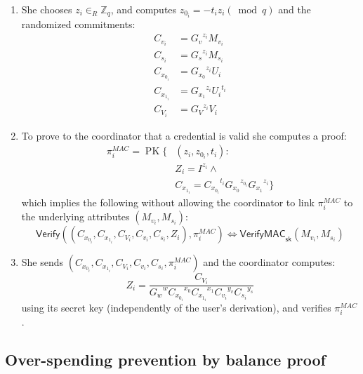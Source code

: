 \documentclass{article}
\begin{document}
\begin{enumerate}

\item She chooses
$z_i \in_{R} \mathbb{Z}_{q}$, and computes
$z_{0_i}=-{t_i} {z_i} (\bmod q)$
and the randomized commitments:
\begin{align*}
C_{v_i}     &= {G_v}^{z_i} M_{v_i} \\
C_{s_i}     &= {G_s}^{z_i} M_{s_i} \\
C_{x_{0_i}} &= {G_{x_0}}^{z_i} {U_i} \\
C_{x_{1_i}} &= {G_{x_1}}^{z_i} {U_i}^{t_i} \\
C_{V_i}     &= {G_V}^{z_i} V_i
\end{align*}

\item To prove to the coordinator that a credential is valid she computes a proof:
\begin{align*}
\pi_{i}^{\mathit{MAC}}=\operatorname{PK}\{
& (z_i, z_{0_i},t_i): \\
& Z_i =I^{z_i} \land \\
& C_{x_{1_i}} = {C_{x_{0_i}}}^{t_i} {G_{x_0}}^{z_{0_i}} {G_{x_1}}^{z_i} \}
\end{align*}
which implies the following without allowing the coordinator to link $\pi_{i}^\mathit{MAC}$ to the underlying attributes $(M_{v_i}, M_{s_i})$:
\[
\mathsf{Verify}((C_{x_{0_i}}, C_{x_{1_i}}, C_{V_i}, C_{v_i}, C_{s_i}, Z_i), \pi_i^{\mathit{MAC}})
\iff
\mathsf{VerifyMAC}_{\mathsf{sk}}(M_{v_i}, M_{s_i})
\]

\item She sends $(C_{x_{0_i}}, C_{x_{1_i}}, C_{V_i}, C_{v_i}, C_{s_i}, \pi_i^{\mathit{MAC}})$ and the coordinator computes:
\[
Z_i=\frac{C_{V_i}}{{G_w}^w {C_{x_{0_i}}}^{x_0} {C_{x_{1_i}}}^{x_{1}}
{C_{v_i}}^{y_v} {C_{s_i}}^{y_s}
}
\]
using its secret key (independently of the user's derivation), and verifies $\pi_i^{\mathit{MAC}}$.

\end{enumerate}

\subsection{Over-spending prevention by balance proof}\label{balance}
\end{document}
